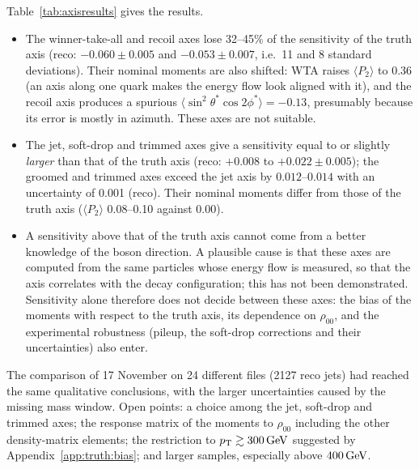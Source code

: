 Table~\ref{tab:axisresults} gives the results.
\begin{itemize}
\item The winner-take-all and recoil axes lose 32--45\% of the sensitivity of the truth axis (reco: $-0.060 \pm 0.005$
  and $-0.053 \pm 0.007$, i.e.\ 11 and 8 standard deviations). Their nominal moments are also shifted: WTA raises
  $\langle P_2\rangle$ to 0.36 (an axis along one quark makes the energy flow look aligned with it), and the recoil axis
  produces a spurious $\langle\sin^2\theta^*\cos2\phi^*\rangle = -0.13$, presumably because its error is mostly in
  azimuth. These axes are not suitable.
\item The jet, soft-drop and trimmed axes give a sensitivity equal to or slightly \emph{larger} than that of the truth
  axis (reco: $+0.008$ to $+0.022 \pm 0.005$); the groomed and trimmed axes exceed the jet axis by $0.012$--$0.014$
  with an uncertainty of 0.001 (reco). Their nominal moments differ from those of the truth axis ($\langle P_2\rangle$
  0.08--0.10 against 0.00).
\item A sensitivity above that of the truth axis cannot come from a better knowledge of the boson direction. A
  plausible cause is that these axes are computed from the same particles whose energy flow is measured, so that the
  axis correlates with the decay configuration; this has not been demonstrated. Sensitivity alone therefore does not
  decide between these axes: the bias of the moments with respect to the truth axis, its dependence on $\rho_{00}$, and
  the experimental robustness (pileup, the soft-drop corrections and their uncertainties) also enter.
\end{itemize}
The comparison of 17 November on 24 different files (2127 reco jets) had reached the same qualitative conclusions, with
the larger uncertainties caused by the missing mass window. Open points: a choice among the jet, soft-drop and trimmed
axes; the response matrix of the moments to $\rho_{00}$ including the other density-matrix elements; the restriction to
$p_{\mathrm{T}} \gtrsim 300\,\mathrm{GeV}$ suggested by Appendix~\ref{app:truth:bias}; and larger samples, especially above $400\,\mathrm{GeV}$.
